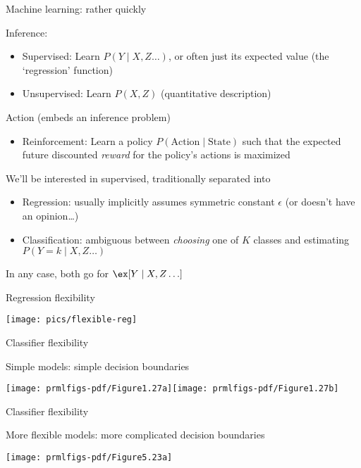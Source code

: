 \documentclass{hertieteaching}
\begin{document}
\begin{frame}{Machine learning: rather quickly}

Inference:
\begin{itemize}
  \item Supervised: Learn $P(Y \mid X, Z\ldots)$, or often just its expected value (the `regression' function)
  \item Unsupervised: Learn $P(X, Z)$ (quantitative description)
\end{itemize}

\pause

Action (embeds an inference problem) 
\begin{itemize}
  \item Reinforcement: Learn a policy $P(\text{Action} \mid \text{State})$ such that the expected future discounted \textit{reward} for the policy's actions is maximized 
\end{itemize}

\pause

We'll be interested in supervised, traditionally separated into 
\begin{itemize}
  \item Regression: usually implicitly assumes symmetric constant $\epsilon$ (or doesn't have an opinion\ldots)
  \item Classification: ambiguous between \textit{choosing} one of $K$ classes and estimating $P(Y=k \mid  X, Z\ldots)$
\end{itemize}
In any case, both go for $\ex[Y \mid X, Z\ldots]$

\end{frame}

\begin{frame}{Regression flexibility}

\centerline{\texttt{[image: pics/flexible-reg]}}
  
\end{frame}


\begin{frame}{Classifier flexibility}

Simple models: simple decision boundaries

\centerline{\hfill\texttt{[image: prmlfigs-pdf/Figure1.27a]}\hfill\texttt{[image: prmlfigs-pdf/Figure1.27b]}\hfill}
\end{frame}

\begin{frame}{Classifier flexibility}

More flexible models: more complicated decision boundaries
\medskip
\centerline{\texttt{[image: prmlfigs-pdf/Figure5.23a]}}


\end{frame}
\end{document}
